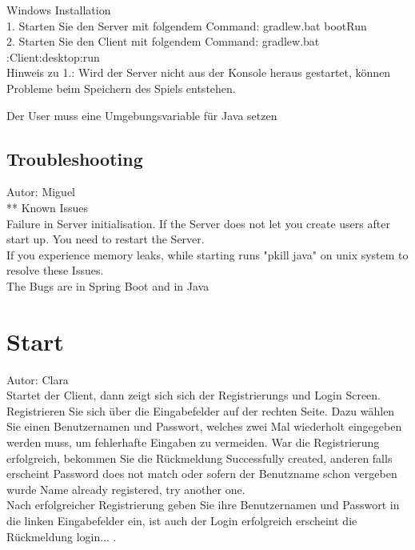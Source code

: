 \documentclass[fontsize=12pt,paper=a4,twoside]{scrartcl}
\begin{document}
Windows Installation \\

1. Starten Sie den Server mit folgendem Command: gradlew.bat bootRun\\
2. Starten Sie den Client mit folgendem Command:  gradlew.bat :Client:desktop:run \\

Hinweis zu 1.: Wird der Server nicht aus der Konsole heraus gestartet, können Probleme beim Speichern 
des Spiels entstehen.

Der User muss eine Umgebungsvariable für Java setzen

\subsection{Troubleshooting}
Autor: Miguel\\

** Known Issues\\
Failure in Server initialisation. If the Server does not let you create users after start up. You need to restart the Server.\\
If you experience memory leaks, while starting runs "pkill java" on unix system to resolve these Issues.\\
The Bugs are in Spring Boot and in Java\\



\section{Start}
Autor: Clara\\

Startet der Client, dann zeigt sich sich der Registrierungs und Login Screen.
Registrieren Sie sich über die Eingabefelder auf der rechten Seite. Dazu wählen Sie einen Benutzernamen und Passwort, welches zwei Mal wiederholt eingegeben werden muss, um fehlerhafte Eingaben zu vermeiden.
War die Registrierung erfolgreich, bekommen Sie die Rückmeldung Successfully created, anderen falls erscheint Password does not match oder sofern der Benutzname schon vergeben wurde Name already
registered, try another one.\\
Nach erfolgreicher Registrierung geben Sie ihre Benutzernamen und Passwort in die linken Eingabefelder ein, ist auch der Login erfolgreich erscheint die Rückmeldung login... .\\
\end{document}
